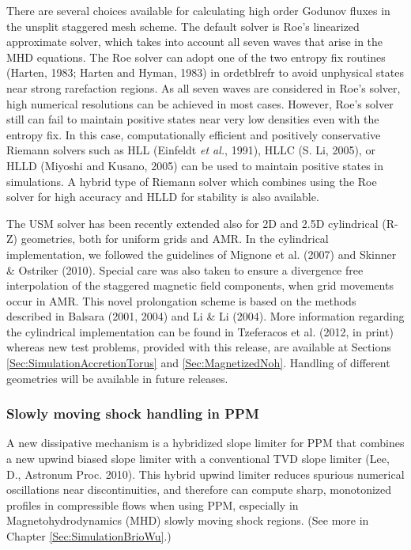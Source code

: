 There are several choices available for calculating high order Godunov fluxes in the
unsplit staggered mesh scheme. The default solver is Roe's linearized approximate solver, which takes into
account all seven waves that arise in the MHD equations. The Roe solver can adopt
one of the two entropy fix routines (Harten, 1983; Harten and Hyman, 1983) in ordetblrefr to avoid unphysical states 
near strong rarefaction regions. As all seven waves are considered in Roe's
solver, high numerical resolutions can be achieved in most cases.
However, Roe's solver still can fail to maintain positive states near very low densities 
even with the entropy fix. In this case, computationally efficient and positively conservative Riemann solvers
such as HLL (Einfeldt {\it et al.}, 1991), HLLC (S. Li, 2005), or HLLD (Miyoshi and Kusano, 2005)
can be used to maintain positive states in simulations. A hybrid type of Riemann solver which combines
using the Roe solver for high accuracy and HLLD for stability is also available. 

The USM solver has been recently extended also for 2D and 2.5D cylindrical (R-Z)
geometries, both for uniform grids and AMR. In the cylindrical implementation,
we followed the guidelines of Mignone et al. (2007) and Skinner \& Ostriker (2010).
Special care was also taken to ensure a divergence free interpolation of
the staggered magnetic field components, when grid movements occur in AMR.
This novel prolongation scheme is based on the methods described in
Balsara (2001, 2004) and Li \& Li (2004). More information regarding
the cylindrical implementation can be found in Tzeferacos et al.
(2012, in print) whereas new test problems, provided with this release,
are available at Sections \ref{Sec:SimulationAccretionTorus} and \ref{Sec:MagnetizedNoh}.
Handling of different geometries will be available in future releases.

\subsubsection{Slowly moving shock handling in PPM}
A new dissipative mechanism is a hybridized 
slope limiter for PPM that combines a new upwind
biased slope limiter with a conventional TVD slope limiter 
(Lee, D., Astronum Proc. 2010).
This hybrid upwind limiter reduces spurious
numerical oscillations near discontinuities, and therefore can
compute sharp, monotonized profiles in compressible flows when using PPM, especially in 
Magnetohydrodynamics (MHD) slowly moving shock regions.
(See more in Chapter \ref{Sec:SimulationBrioWu}.)

